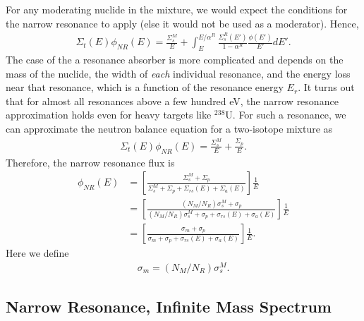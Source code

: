 For any moderating nuclide in the mixture, we would expect the conditions for the narrow resonance to apply (else it would not be used as a moderator). Hence,
\begin{align}
  \Sigma_t(E) \phi_{NR}(E) = \frac{\Sigma_s^M}{E} +  \int_E^{E/\alpha^R} \frac{\Sigma_s^R(E')}{ 1 - \alpha^R } \frac{ \phi(E') }{ E' } dE' . \label{Eq:libraryGeneration_neutronBalanceMixture_NR_step1}
\end{align}
The case of the a resonance absorber is more complicated and depends on the mass of the nuclide, the width of \emph{each} individual resonance, and the energy loss near that resonance, which is a function of the resonance energy $E_r$. It turns out that for almost all resonances above a few hundred eV, the narrow resonance approximation holds even for heavy targets like $^{238}$U. For such a resonance, we can approximate the neutron balance equation for a two-isotope mixture as
\begin{align}
  \Sigma_t(E) \phi_{NR}(E) = \frac{\Sigma_s^M}{E} + \frac{\Sigma_p}{E} . \label{Eq:libraryGeneration_neutronBalanceMixture_NR}
\end{align}
Therefore, the narrow resonance flux is
\begin{align}
  \phi_{NR}(E) 
  &= \left[ \frac{ \Sigma_s^M + \Sigma_p }{ \Sigma_s^M + \Sigma_p + \Sigma_{rs}(E) + \Sigma_a(E) } \right] \frac{1}{E} \nonumber \\
  &= \left[ \frac{ (N_M/N_R) \sigma_s^M + \sigma_p }{ (N_M/N_R) \sigma_s^M  + \sigma_p + \sigma_{rs}(E) + \sigma_a(E) } \right] \frac{1}{E} \nonumber \\
  &= \left[ \frac{ \sigma_m + \sigma_p }{ \sigma_m + \sigma_p + \sigma_{rs}(E) + \sigma_a(E) } \right] \frac{1}{E} .
\end{align}
Here we define
\begin{align}
  \sigma_m = (N_M/N_R) \sigma_s^M .
\end{align}


\subsection{Narrow Resonance, Infinite Mass Spectrum}

